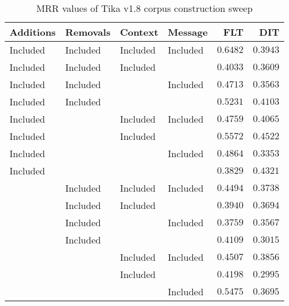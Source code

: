 
\begin{table}
\begin{spacing}{1.2}
\centering
\caption{MRR values of Tika v1.8 corpus construction sweep}
\label{table:tika_corpus_sweep}
\vspace{0.2em}
\begin{tabular}{llll|rr}
\toprule
Additions &  Removals &   Context &   Message & FLT &        DIT \\
\midrule
 Included &  Included &  Included &  Included &    $\bm{0.6482}$ &      $0.3943$ \\
 \myrowcolor Included &  Included &  Included &           &         $0.4033$ &      $0.3609$ \\
 Included &  Included &           &  Included &         $0.4713$ &      $0.3563$ \\
 Included &  Included &           &           &         $0.5231$ &      $0.4103$ \\
 Included &           &  Included &  Included &         $0.4759$ &      $0.4065$ \\
 Included &           &  Included &           &         $0.5572$ & $\bm{0.4522}$ \\
 Included &           &           &  Included &         $0.4864$ &      $0.3353$ \\
 Included &           &           &           &         $0.3829$ &      $0.4321$ \\
          &  Included &  Included &  Included &         $0.4494$ &      $0.3738$ \\
          &  Included &  Included &           &         $0.3940$ &      $0.3694$ \\
          &  Included &           &  Included &         $0.3759$ &      $0.3567$ \\
          &  Included &           &           &         $0.4109$ &      $0.3015$ \\
          &           &  Included &  Included &         $0.4507$ &      $0.3856$ \\
          &           &  Included &           &         $0.4198$ &      $0.2995$ \\
          &           &           &  Included &         $0.5475$ &      $0.3695$ \\
\bottomrule
\end{tabular}

\end{spacing}
\end{table}
